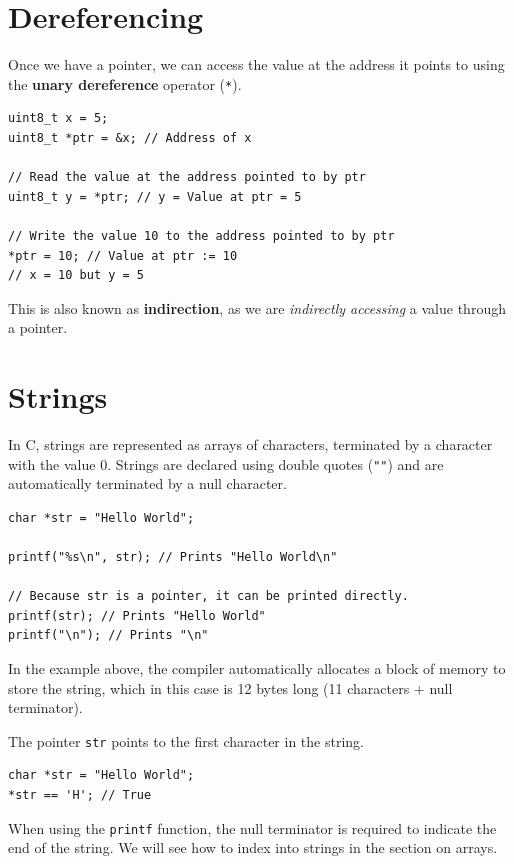 \documentclass{report}
\begin{document}
\section{Dereferencing}
Once we have a pointer, we can access the value at the address it points to using the
\textbf{unary dereference} operator (\texttt{*}).
\begin{verbatim}
uint8_t x = 5;
uint8_t *ptr = &x; // Address of x

// Read the value at the address pointed to by ptr
uint8_t y = *ptr; // y = Value at ptr = 5

// Write the value 10 to the address pointed to by ptr
*ptr = 10; // Value at ptr := 10
// x = 10 but y = 5
\end{verbatim}
This is also known as \textbf{indirection}, as we are \textit{indirectly accessing} a value through a pointer.
\section{Strings}
In C, strings are represented as arrays of characters, terminated by a character with the value 0.
Strings are declared using double quotes (\texttt{""}) and are automatically terminated by a null character. %
\begin{verbatim}
char *str = "Hello World";

printf("%s\n", str); // Prints "Hello World\n"

// Because str is a pointer, it can be printed directly.
printf(str); // Prints "Hello World"
printf("\n"); // Prints "\n"
\end{verbatim}
In the example above, the compiler automatically allocates a block of memory to store the string,
which in this case is 12 bytes long (11 characters + null terminator).

The pointer \texttt{str} points to the first character in the string.
\begin{verbatim}
char *str = "Hello World";
*str == 'H'; // True
\end{verbatim}
When using the \texttt{printf} function, the null terminator is required to indicate the end of the string.
We will see how to index into strings in the section on arrays.
\end{document}
